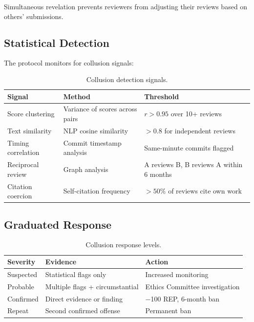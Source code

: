 \documentclass[11pt,letterpaper]{article}
\begin{document}
Simultaneous revelation prevents reviewers from adjusting their reviews based on others' submissions.

\subsection{Statistical Detection}

The protocol monitors for collusion signals:

\begin{table}[h]
\centering
\caption{Collusion detection signals.}
\label{tab:detection}
\begin{tabular}{p{3cm}p{4cm}p{4cm}}
\toprule
\textbf{Signal} & \textbf{Method} & \textbf{Threshold} \\
\midrule
Score clustering & Variance of scores across pairs & $r > 0.95$ over 10+ reviews \\
Text similarity & NLP cosine similarity & $> 0.8$ for independent reviews \\
Timing correlation & Commit timestamp analysis & Same-minute commits flagged \\
Reciprocal review & Graph analysis & A reviews B, B reviews A within 6 months \\
Citation coercion & Self-citation frequency & $> 50\%$ of reviews cite own work \\
\bottomrule
\end{tabular}
\end{table}

\subsection{Graduated Response}

\begin{table}[h]
\centering
\caption{Collusion response levels.}
\label{tab:response}
\begin{tabular}{lll}
\toprule
\textbf{Severity} & \textbf{Evidence} & \textbf{Action} \\
\midrule
Suspected & Statistical flags only & Increased monitoring \\
Probable & Multiple flags + circumstantial & Ethics Committee investigation \\
Confirmed & Direct evidence or finding & $-$100 REP, 6-month ban \\
Repeat & Second confirmed offense & Permanent ban \\
\bottomrule
\end{tabular}
\end{table}
\end{document}
